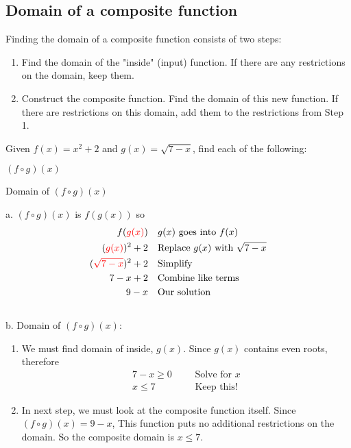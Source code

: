 \subsection{Domain of a composite function}
Finding the domain of a composite function consists of two steps: 
\begin{enumerate}[\bfseries 1.]
    \item Find the domain of the "inside" (input) function. If there are any restrictions on the domain, keep them. 
    \item Construct the composite function. Find the domain of this new function. If there are restrictions on this domain, add them to the restrictions from Step 1. 
\end{enumerate}
\begin{exa}
    Given $f(x)= x^2+2$ and $g(x)=\sqrt{7-x}$, find each of the following:
    \begin{enumerate}[\bfseries a.]
    \begin{multicols}{2}
        \item $(f \circ g)(x)$
        \item Domain of $(f \circ g)(x)$
    \end{multicols}
    \end{enumerate}
\end{exa}
%
\vspace{0.2cm}
%
a. $(f \circ g)(x)$ is $f(g(x))$ so
\begin{align*}
    f(\textcolor{red}{g(x)})&    &   &\text{$g(x)$ goes into $f(x)$}\\
    (\textcolor{red}{g(x)})^2+2& &   &\text{Replace $g(x)$ with $\sqrt{7-x}$}\\
    (\textcolor{red}{\sqrt{7-x}})^2+2&   &   &\text{Simplify}\\
    7-x +2 &    &   &\text{Combine like terms}\\
    9-x&    &   &\text{Our solution}
\end{align*}
%
\\[0.2cm]
%
b. Domain of $(f \circ g)(x)$:
\begin{enumerate}[1.]
    \item We must find domain of inside, $g(x)$. Since $g(x)$ contains even roots, therefore
            \begin{align*}
                7-x \ge 0&  &   &\text{Solve for $x$}\\
                x \le 7&    &   &\text{Keep this!}
            \end{align*}
    \item In next step, we must look at the composite function itself. Since $(f \circ g)(x) = 9-x$, This function puts no additional restrictions on the domain. So the composite domain is $x \le 7$.
\end{enumerate}
